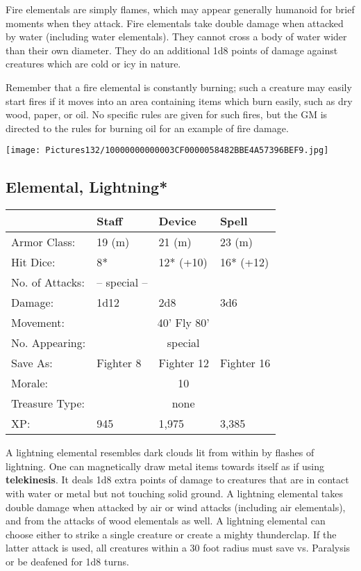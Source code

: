 \documentclass[a4paper,twoside,openany,10pt]{book}
\begin{document}
\begin{multicols}{2}
Fire elementals are simply flames, which may appear generally humanoid for brief moments when they attack. Fire elementals take double damage when attacked by water (including water elementals). They cannot cross a body of water wider than their own diameter. They do an additional 1d8 points of damage against creatures which are cold or icy in nature.

Remember that a fire elemental is constantly burning; such a creature may easily start fires if it moves into an area containing items which burn easily, such as dry wood, paper, or oil. No specific rules are given for such fires, but the GM is directed to the rules for burning oil for an example of fire damage.

\begin{center}
	\texttt{[image: Pictures132/10000000000003CF0000058482BBE4A57396BEF9.jpg]}
\end{center}

\subsection*{Elemental, Lightning*}\label{elemental-lightning}

\begin{tabularx}{0.48\textwidth}{@{}lllX@{}}
& Staff & Device & Spell \\\hline
Armor Class: & 19 (m) & 21 (m) & 23 (m) \\\hline
Hit Dice: & 8* & 12* (+10) & 16* (+12) \\\hline
No. of Attacks: & -- special -- & & \\\hline
Damage: & 1d12 & 2d8 & 3d6 \\\hline
Movement:  & \multicolumn{3}{c}{40' Fly 80'}\\\hline 
No. Appearing: &\multicolumn{3}{c}{special} \\\hline
Save As: & Fighter 8 & Fighter 12 & Fighter 16 \\\hline
Morale: & \multicolumn{3}{c}{10} \\\hline
Treasure Type: & \multicolumn{3}{c}{none} \\\hline
XP: & 945 & 1,975 & 3,385 \\\hline
\end{tabularx}\medskip

A lightning elemental resembles dark clouds lit from within by flashes of lightning. One can magnetically draw metal items towards itself as if using \textbf{telekinesis}. It deals 1d8 extra points of damage to creatures that are in contact with water or metal but not touching solid ground. A lightning elemental takes double damage when attacked by air or wind attacks (including air elementals), and from the attacks of wood elementals as well. A lightning elemental can choose either to strike a single creature or create a mighty thunderclap. If the latter attack is used, all creatures within a 30 foot radius must save vs. Paralysis or be deafened for 1d8 turns.



\end{multicols}
\end{document}
